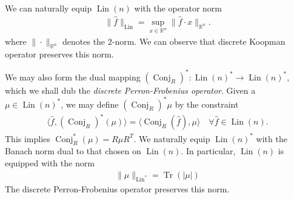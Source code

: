\documentclass[12pt]{amsart}
\newcommand{\R}{\ensuremath{\mathbb{R}}}
\DeclareMathOperator{\Diff}{Diff}
\DeclareMathOperator{\Dens}{Dens}
\DeclareMathOperator{\Lin}{Lin}
\DeclareMathOperator{\Tr}{Tr}
\DeclareMathOperator{\Conj}{Conj}
\begin{document}
We can naturally equip $\Lin(n)$ with the operator norm
\begin{align*}
	\| \hat{f} \|_{\Lin} = \sup_{x \in \R^n} \| \hat{f} \cdot x \|_{\R^n}.
\end{align*}
where $\| \cdot \|_{\R^n}$ denotes the $2$-norm.
We can observe that discrete Koopman operator preserves this norm.

We may also form the dual mapping $(\Conj_R)^*: \Lin(n)^* \to \Lin(n)^*$,
which we shall dub the \emph{discrete Perron-Frobenius operator}.
Given a $\mu \in \Lin(n)^*$, we may define $(\Conj_{R})^* \mu$ by the constraint
\begin{align*}
	\langle \hat{f} , (\Conj_R)^*(\mu) \rangle = \langle \Conj_R(\hat{f}) , \mu \rangle \quad \forall \hat{f} \in \Lin(n).
\end{align*}
This implies $\Conj_R^*(\mu) = R \mu R^T$.
We naturally equip $\Lin(n)^*$ with the Banach norm dual to that chosen on $\Lin(n)$.
In particular, $\Lin(n)$ is  equipped with the norm
\begin{align*}
	\| \mu \|_{\Lin^*} = \Tr(  |\mu| )
\end{align*}
The discrete Perron-Frobenius operator preserves this norm.

\end{document}
